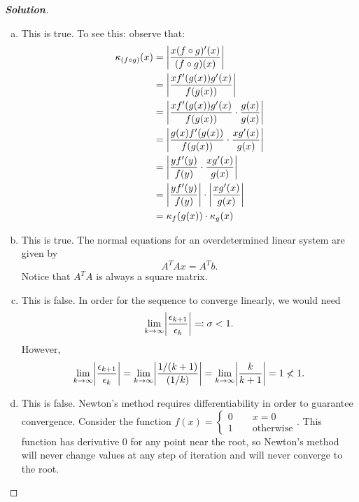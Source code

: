 \documentclass[11pt]{article}
\DeclarePairedDelimiter{\abs}{\lvert}{\rvert}
\newenvironment{solution}{%
  \begin{proof}[\textbf{Solution}]$ $\par\nobreak\ignorespaces
}{%
  \end{proof}
}
\theoremstyle{definition}
\begin{document}
\begin{solution}
\begin{enumerate}[(a)]
\item This is true. To see this: observe that:
    \begin{align*}
        \kappa_{(f \circ g)}(x) &= \abs*{\frac{x (f \circ g)'(x)}{(f \circ g)(x)}} \\
        &= \abs*{\frac{x f'(g(x))g'(x)}{f(g(x))}} \\
        &= \abs*{\frac{x f'(g(x))g'(x)}{f(g(x))} \cdot \frac{g(x)}{g(x)}} \\
        &= \abs*{\frac{g(x)f'(g(x))}{f(g(x))} \cdot \frac{xg'(x)}{g(x)}} \\
        &= \abs*{\frac{yf'(y)}{f(y)} \cdot \frac{xg'(x)}{g(x)}} \\
        &= \abs*{\frac{yf'(y)}{f(y)}} \cdot \abs*{\frac{xg'(x)}{g(x)}} \\
        &= \kappa_f(g(x)) \cdot \kappa_g(x)
    \end{align*}
\item This is true. The normal equations for an overdetermined linear system are given by $$A^TAx = A^T b.$$ Notice that $A^TA$ is always a square matrix.
\item This is false. In order for the sequence to converge linearly, we would need $$\lim_{k \rightarrow \infty}\abs*{\frac{\epsilon_{k+1}}{\epsilon_k}} \eqqcolon \sigma < 1.$$ However, $$\lim_{k \rightarrow \infty}\abs*{\frac{\epsilon_{k+1}}{\epsilon_k}} = \lim_{k \rightarrow \infty}\abs*{\frac{1/(k+1)}{(1/k)}} = \lim_{k \rightarrow \infty}\abs*{\frac{k}{k+1}} = 1 \nless 1.$$
\item This is false. Newton's method requires differentiability in order to guarantee convergence. Consider the function $f(x) = \begin{cases}0 \qquad x = 0 \\ 1 \qquad \text{otherwise}\end{cases}$. This function has derivative 0 for any point near the root, so Newton's method will never change values at any step of iteration and will never converge to the root.
\end{enumerate}
\end{solution}
\newpage
\end{document}
